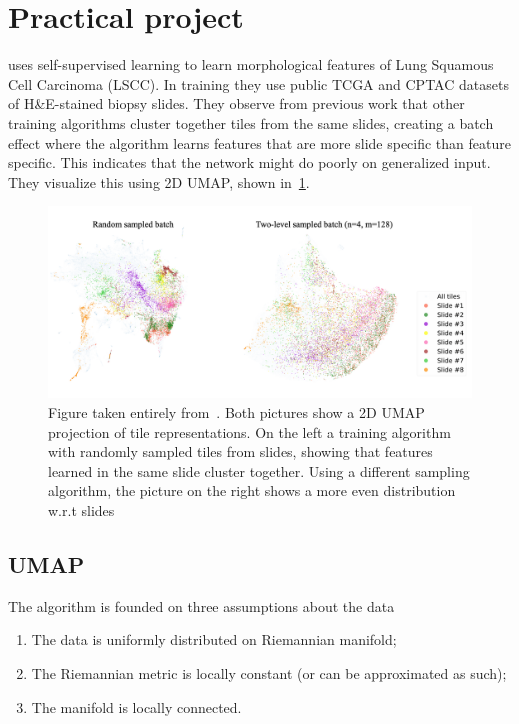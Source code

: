 \documentclass[10pt,twocolumn,letterpaper]{article}
\begin{document}
\section{Practical project}
\cite{sslUMAP} uses self-supervised learning to learn morphological features of Lung Squamous Cell Carcinoma (LSCC). In training they use public TCGA and CPTAC datasets of H\&E-stained biopsy slides. They observe from previous work that other training algorithms cluster together tiles from the same slides, creating a batch effect where the algorithm learns features that are more slide specific than feature specific. This indicates that the network might do poorly on generalized input. They visualize this using 2D UMAP, shown in~\cref{fig:umap}.

\begin{figure}
  \includegraphics[scale=.17]{./umap.png}
  \caption{Figure taken entirely from~\cite{sslUMAP}. Both pictures show a 2D UMAP projection of tile representations. On the left a training algorithm with randomly sampled tiles from slides, showing that features learned in the same slide cluster together. Using a different sampling algorithm, the picture on the right shows a more even distribution w.r.t slides}
  \label{fig:umap}
\end{figure}

\subsection{UMAP}
 The algorithm is founded on three assumptions about the data
 \begin{enumerate}
   \item The data is uniformly distributed on Riemannian manifold;
   \item The Riemannian metric is locally constant (or can be approximated as such);
   \item The manifold is locally connected.
 \end{enumerate}
\end{document}
